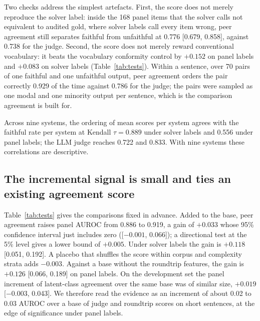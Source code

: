 \documentclass[11pt,letterpaper]{article}
\begin{document}
Two checks address the simplest artefacts. First, the score does not merely reproduce the solver label: inside the 168 panel items that the solver calls not equivalent to audited gold, where solver labels call every item wrong, peer agreement still separates faithful from unfaithful at 0.776 [0.679, 0.858], against 0.738 for the judge. Second, the score does not merely reward conventional vocabulary: it beats the vocabulary conformity control by $+0.152$ on panel labels and $+0.083$ on solver labels (Table~\ref{tab:tests}). Within a sentence, over 70 pairs of one faithful and one unfaithful output, peer agreement orders the pair correctly 0.929 of the time against 0.786 for the judge; the pairs were sampled as one modal and one minority output per sentence, which is the comparison agreement is built for.

Across nine systems, the ordering of mean scores per system agrees with the faithful rate per system at Kendall $\tau = 0.889$ under solver labels and 0.556 under panel labels; the LLM judge reaches 0.722 and 0.833. With nine systems these correlations are descriptive.

\subsection{The incremental signal is small and ties an existing agreement score}
\label{sec:increment}

Table~\ref{tab:tests} gives the comparisons fixed in advance. Added to the base, peer agreement raises panel AUROC from 0.886 to 0.919, a gain of $+0.033$ whose 95\% confidence interval just includes zero ([$-0.001$, 0.066]); a directional test at the 5\% level gives a lower bound of $+0.005$. Under solver labels the gain is $+0.118$ [0.051, 0.192]. A placebo that shuffles the score within corpus and complexity strata adds $-0.003$. Against a base without the roundtrip features, the gain is $+0.126$ [0.066, 0.189] on panel labels. On the development set the panel increment of latent-class agreement over the same base was of similar size, $+0.019$ [$-0.003$, 0.043]. We therefore read the evidence as an increment of about 0.02 to 0.03 AUROC over a base of judge and roundtrip scores on short sentences, at the edge of significance under panel labels.
\end{document}
